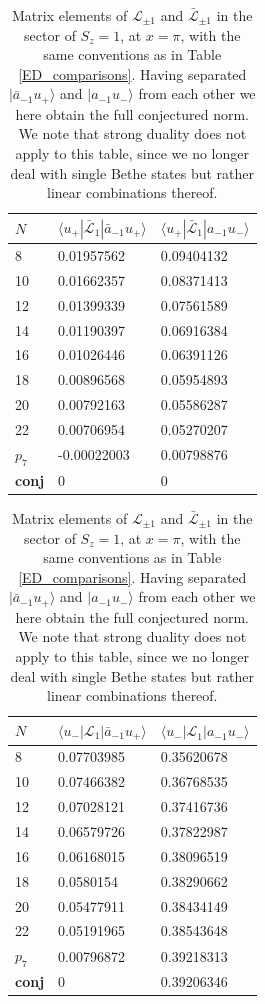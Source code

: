 \documentclass[a4paper,10pt]{article}
\newcommand{\KSgen}{\mathcal{L}}
\begin{document}
\begin{table}[H]
\begin{minipage}{0.5\linewidth}
\center
\begin{tabular}{lll}
$N$     &$\langle u_+ |\bar{\mathcal L}_{1}| \bar{a}_{-1} u_+  \rangle$ & $\langle u_+ |\bar{\mathcal L}_{1}| a_{-1} u_- \rangle$  \\
\hline
8 & 0.01957562 & 0.09404132 \\
10 & 0.01662357 & 0.08371413 \\
12 & 0.01399339 & 0.07561589 \\
14 & 0.01190397 & 0.06916384 \\
16 & 0.01026446 & 0.06391126 \\
18 & 0.00896568 & 0.05954893 \\
20 & 0.00792163 & 0.05586287 \\
22 & 0.00706954 & 0.05270207 \\
$p_7$ & \hspace*{-3.5pt}-0.00022003 & 0.00798876 \\
\bf{conj} & 0 & 0 \\
\hline
\end{tabular}
\end{minipage}%
\begin{minipage}{0.5\linewidth}
\center
\begin{tabular}{lll}
$N$     &$\langle u_- |{\mathcal L}_{1}|\bar{a}_{-1} u_+ \rangle$  & $\langle u_- |{\mathcal L}_{1}| a_{-1} u_-  \rangle$   \\
\hline
8 & 0.07703985 & 0.35620678 \\
10 & 0.07466382 & 0.36768535 \\
12 & 0.07028121 & 0.37416736 \\
14 & 0.06579726 & 0.37822987 \\
16 & 0.06168015 & 0.38096519 \\
18 & 0.0580154 & 0.38290662 \\
20 & 0.05477911 & 0.38434149 \\
22 & 0.05191965 & 0.38543648 \\
$p_7$ & 0.00796872 & 0.39218313 \\
\bf{conj} & 0  & 0.39206346 \\
\hline
\end{tabular}
\end{minipage}%

\caption{Matrix elements of $\KSgen_{\pm 1}$ and $\bar{\KSgen}_{\pm 1}$ in the sector of $S_z=1$, at $x=\pi$, with the same conventions as in Table \ref{ED_comparisons}. Having separated $|\bar{a}_{-1} u_+\rangle$ and $| a_{-1} u_- \rangle$ from each other we here obtain the full conjectured norm. %
We note that strong duality does not apply to this table, since we no longer deal with single Bethe states but rather linear combinations thereof.
}\label{ED_comparisons_unmixed}
\end{table}
\end{document}
